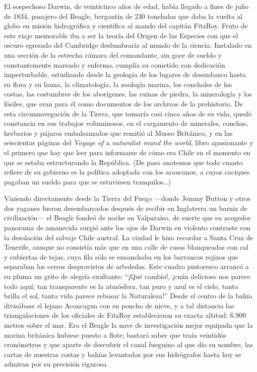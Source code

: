 \documentclass[10pt,twoside,openright]{memoir}
\begin{document}
El sospechoso Darwin, de veinticinco
años de edad, había llegado a fines de julio de 1834, pasajero del
Beagle, bergantín de 230 toneladas que daba la vuelta al globo en misión
hidrográfica y científica al mando del capitán FitzRoy. Fruto de este
viaje memorable iba a ser la teoría del Origen de las Especies con que
el oscuro egresado del Cambridge deslumbraría al mundo de la ciencia.
Instalado en una sección de la
estrecha cámara del comandante, sin goce de sueldo y constantemente
mareado y enfermo, cumplía su
cometido con dedicación imperturbable, estudiando desde la geología de
los lugares de desembarco hasta su flora y su fauna, la climatología, la
zoología marina, los conchales de las costas, las costumbres de los
aborígenes, las ruinas de piedra, la mineralogía y los fósiles, que eran
para él como documentos de los archivos de la prehistoria. De esta
circunnavegación de la Tierra, que tomaría casi cinco años de su vida,
quedó constancia en sus trabajos voluminosos, en el cargamento de
minerales, conchas, herbarios y pájaros embalsamados que remitió al
Museo Británico, y en las seiscientas páginas del \emph{Voyage of a
naturalist round the world}, libro apasionante y el primero que hay que
leer para informarse de cómo era Chile en el momento en que se estaba
estructurando la República. (De paso anotemos que todo
cuanto refiere de su gobierno es la
política adoptada con los araucanos,
a cuyos caciques pagaban un sueldo para que se estuviesen tranquilos\ldots)

Viniendo directamente desde la Tierra del Fuego ---donde Jemmy Button y
otros dos yaganes fueron desembarcados después de recibir en Inglaterra
un barniz de civilización--- el Beagle fondeó de noche
en Valparaíso, de suerte que su
acogedor panorama de amanecida surgió ante los ojos de Darwin en
violento contraste con la desolación del salvaje Chile
austral. La ciudad le hizo recordar
a Santa Cruz de Tenerife, aunque no consistía más que en una calle
de casas blanqueadas con cal y
cubiertas de tejas, cuya fila sólo se ensanchaba en los barrancos
rojizos que separaban los cerros desprovistos de arboledas.
Este cuadro pintoresco arrancó a su
pluma un grito de alegría exultante:
``¡Qué cambio!, ¡cuán delicioso nos parece todo aquí; tan transparente es
la atmósfera, tan puro y azul es el cielo, tanto brilla el sol, tanta
vida parece rebosar la Naturaleza!'' Desde el centro de la bahía
divisábase el lejano Aconcagua con
su poncho de nieve, y a tal
distancia las triangulaciones de los oficiales de FitzRoy establecieron
su exacta altitud: 6.900 metros sobre el mar. Era el Beagle la nave de
investigación mejor equipada que la marina británica hubiese puesto a
flote; bastará saber que traía veintidós cronómetros y que aparte de
descubrir el canal fueguino al que dio su nombre, las cartas de nuestras
costas y bahías levantadas por sus hidrógrafos hasta hoy se admiran por
su precisión rigurosa.
\end{document}
